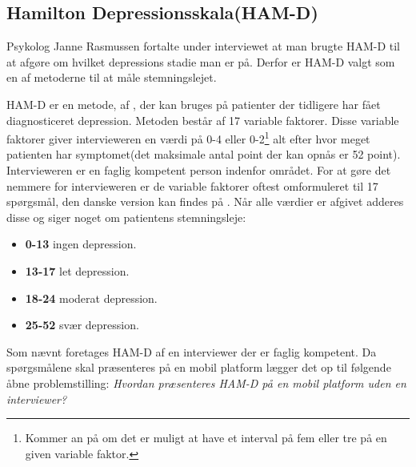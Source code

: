 \subsection{Hamilton Depressionsskala(HAM-D)}
Psykolog Janne Rasmussen fortalte under interviewet at man brugte HAM-D til at afgøre om hvilket depressions stadie man er på.\cite[Afsnit 1.3, Møde med Psykolog Janne Rasmussen]{faelles}
Derfor er HAM-D valgt som en af metoderne til at måle stemningslejet.

HAM-D er en metode, af \citet{ham_d}, der kan bruges på patienter der tidligere har fået diagnosticeret depression. 
Metoden består af 17 variable faktorer.
Disse variable faktorer giver intervieweren en værdi på 0-4 eller 0-2\footnote{Kommer an på om det er muligt at have et interval på fem eller tre på en given variable faktor.} alt efter hvor meget patienten har symptomet(det maksimale antal point der kan opnås er 52 point).
Intervieweren er en faglig kompetent person indenfor området.
For at gøre det nemmere for intervieweren er de variable faktorer oftest omformuleret til 17 spørgsmål, den danske version kan findes på \citet{ham_d_dansk}.
Når alle værdier er afgivet adderes disse og siger noget om patientens stemningsleje:
\begin{itemize}
	\item \textbf{0-13} ingen depression.
	\item \textbf{13-17} let depression.
	\item \textbf{18-24} moderat depression.
	\item \textbf{25-52} svær depression.
\end{itemize}

Som nævnt foretages HAM-D af en interviewer der er faglig kompetent.
Da spørgsmålene skal præsenteres på en mobil platform lægger det op til følgende åbne problemstilling: \textit{Hvordan præsenteres HAM-D på en mobil platform uden en interviewer?}
